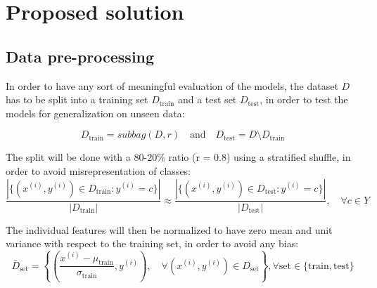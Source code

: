 \documentclass{article}
\begin{document}
\section{Proposed solution}
\subsection{Data pre-processing}
In order to have any sort of meaningful evaluation of the models, the dataset $D$ has to be split into a training set $D_{\text{train}}$ and a test set $D_{\text{test}}$, 
in order to test the models for generalization on unseen data:

\begin{equation*}
    D_{\text{train}} = subbag(D, r) \quad \text{and} \quad D_{\text{test}} = D \setminus D_{\text{train}}
\end{equation*}

The split will be done with a $80$-$20\%$ ratio (r = 0.8) using a stratified shuffle, in order to avoid misrepresentation of classes:
\vspace*{-0.4em}
\begin{equation*}
    \frac
        {|\{(x^{(i)}, y^{(i)}) \in D_{\text{train}} : y^{(i)} = c\}|}
        {|D_{\text{train}}|}
    \approx 
    \frac
        {|\{(x^{(i)}, y^{(i)}) \in D_{\text{test}} : y^{(i)} = c\}|}
        {|D_{\text{test}}|},
    \quad \forall c \in Y
\end{equation*}

The individual features will then be normalized to have zero mean and unit variance with respect to the training set, in order to avoid any bias:
\vspace*{-0.6em}
\begin{equation*}
    \bar{D}_{\text{set}} = \left\{
        \left(\frac{x^{(i)} - \mu_{\text{train}}}{\sigma_{\text{train}}}, y^{(i)}\right), 
        \quad \forall (x^{(i)}, y^{(i)}) \in D_{\text{set}}
    \right\}, \forall \text{set} \in \{\text{train}, \text{test}\}
\end{equation*}
\end{document}
